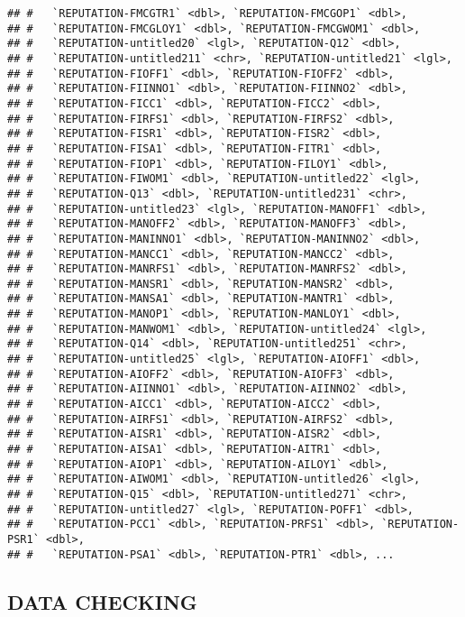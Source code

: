 \documentclass[
]{article}
\begin{document}
\begin{verbatim}
## #   `REPUTATION-FMCGTR1` <dbl>, `REPUTATION-FMCGOP1` <dbl>,
## #   `REPUTATION-FMCGLOY1` <dbl>, `REPUTATION-FMCGWOM1` <dbl>,
## #   `REPUTATION-untitled20` <lgl>, `REPUTATION-Q12` <dbl>,
## #   `REPUTATION-untitled211` <chr>, `REPUTATION-untitled21` <lgl>,
## #   `REPUTATION-FIOFF1` <dbl>, `REPUTATION-FIOFF2` <dbl>,
## #   `REPUTATION-FIINNO1` <dbl>, `REPUTATION-FIINNO2` <dbl>,
## #   `REPUTATION-FICC1` <dbl>, `REPUTATION-FICC2` <dbl>,
## #   `REPUTATION-FIRFS1` <dbl>, `REPUTATION-FIRFS2` <dbl>,
## #   `REPUTATION-FISR1` <dbl>, `REPUTATION-FISR2` <dbl>,
## #   `REPUTATION-FISA1` <dbl>, `REPUTATION-FITR1` <dbl>,
## #   `REPUTATION-FIOP1` <dbl>, `REPUTATION-FILOY1` <dbl>,
## #   `REPUTATION-FIWOM1` <dbl>, `REPUTATION-untitled22` <lgl>,
## #   `REPUTATION-Q13` <dbl>, `REPUTATION-untitled231` <chr>,
## #   `REPUTATION-untitled23` <lgl>, `REPUTATION-MANOFF1` <dbl>,
## #   `REPUTATION-MANOFF2` <dbl>, `REPUTATION-MANOFF3` <dbl>,
## #   `REPUTATION-MANINNO1` <dbl>, `REPUTATION-MANINNO2` <dbl>,
## #   `REPUTATION-MANCC1` <dbl>, `REPUTATION-MANCC2` <dbl>,
## #   `REPUTATION-MANRFS1` <dbl>, `REPUTATION-MANRFS2` <dbl>,
## #   `REPUTATION-MANSR1` <dbl>, `REPUTATION-MANSR2` <dbl>,
## #   `REPUTATION-MANSA1` <dbl>, `REPUTATION-MANTR1` <dbl>,
## #   `REPUTATION-MANOP1` <dbl>, `REPUTATION-MANLOY1` <dbl>,
## #   `REPUTATION-MANWOM1` <dbl>, `REPUTATION-untitled24` <lgl>,
## #   `REPUTATION-Q14` <dbl>, `REPUTATION-untitled251` <chr>,
## #   `REPUTATION-untitled25` <lgl>, `REPUTATION-AIOFF1` <dbl>,
## #   `REPUTATION-AIOFF2` <dbl>, `REPUTATION-AIOFF3` <dbl>,
## #   `REPUTATION-AIINNO1` <dbl>, `REPUTATION-AIINNO2` <dbl>,
## #   `REPUTATION-AICC1` <dbl>, `REPUTATION-AICC2` <dbl>,
## #   `REPUTATION-AIRFS1` <dbl>, `REPUTATION-AIRFS2` <dbl>,
## #   `REPUTATION-AISR1` <dbl>, `REPUTATION-AISR2` <dbl>,
## #   `REPUTATION-AISA1` <dbl>, `REPUTATION-AITR1` <dbl>,
## #   `REPUTATION-AIOP1` <dbl>, `REPUTATION-AILOY1` <dbl>,
## #   `REPUTATION-AIWOM1` <dbl>, `REPUTATION-untitled26` <lgl>,
## #   `REPUTATION-Q15` <dbl>, `REPUTATION-untitled271` <chr>,
## #   `REPUTATION-untitled27` <lgl>, `REPUTATION-POFF1` <dbl>,
## #   `REPUTATION-PCC1` <dbl>, `REPUTATION-PRFS1` <dbl>, `REPUTATION-PSR1` <dbl>,
## #   `REPUTATION-PSA1` <dbl>, `REPUTATION-PTR1` <dbl>, ...
\end{verbatim}

\hypertarget{data-checking}{%
\subsection{DATA CHECKING}\label{data-checking}}
\end{document}
